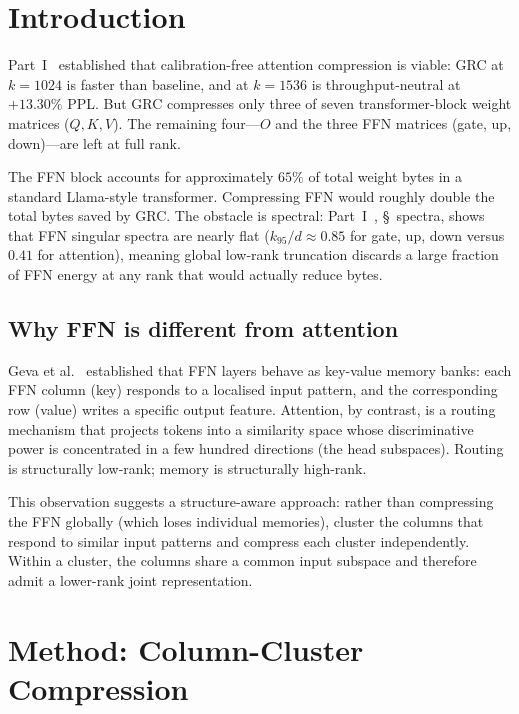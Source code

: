 \documentclass[11pt]{article}
\begin{document}
\section{Introduction}
\label{sec:intro}

Part~I~\cite{stewart2026grc} established that calibration-free attention
compression is viable: GRC at $k{=}1024$ is faster than baseline, and
at $k{=}1536$ is throughput-neutral at $+13.30\%$ PPL.  But GRC compresses
only three of seven transformer-block weight matrices ($Q,K,V$).  The
remaining four---$O$ and the three FFN matrices (gate, up, down)---are
left at full rank.

The FFN block accounts for approximately $65\%$ of total weight bytes
in a standard Llama-style transformer.  Compressing FFN would roughly
double the total bytes saved by GRC.  The obstacle is spectral:
Part~I~\cite{stewart2026grc}, \S~spectra, shows that FFN singular spectra are nearly
flat ($k_{95}/d\approx0.85$ for gate, up, down versus $0.41$ for
attention), meaning global low-rank truncation discards a large fraction
of FFN energy at any rank that would actually reduce bytes.

\subsection{Why FFN is different from attention}

Geva et al.~\cite{geva2021ffn} established that FFN layers behave as
key-value memory banks: each FFN column (key) responds to a localised
input pattern, and the corresponding row (value) writes a specific
output feature.  Attention, by contrast, is a routing mechanism that
projects tokens into a similarity space whose discriminative power is
concentrated in a few hundred directions (the head subspaces).  Routing
is structurally low-rank; memory is structurally high-rank.

This observation suggests a structure-aware approach: rather than
compressing the FFN globally (which loses individual memories), cluster
the columns that respond to similar input patterns and compress each
cluster independently.  Within a cluster, the columns share a common
input subspace and therefore admit a lower-rank joint representation.

\section{Method: Column-Cluster Compression}
\label{sec:method}
\end{document}
